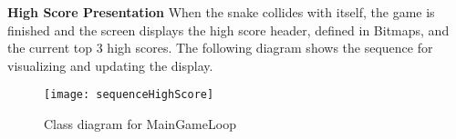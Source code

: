 	\textbf{High Score Presentation} \newline
		When the snake collides with itself, the game is finished and the screen displays the high score header, defined in Bitmaps, and the current top 3 high scores. The following diagram shows the sequence for visualizing and updating the display.
		
			\begin{figure}[H]
				\texttt{[image: sequenceHighScore]}
				\centering
				\caption{Class diagram for MainGameLoop}
				\label{fig:classMain}
			\end{figure}
		




